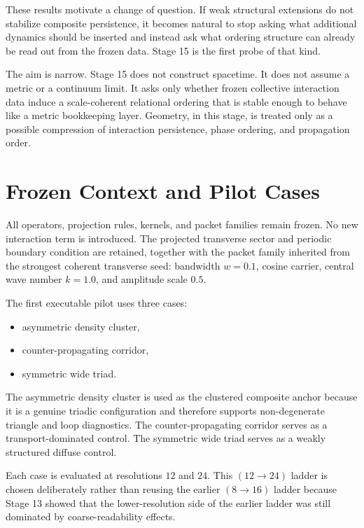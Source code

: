\documentclass[11pt]{article}
\begin{document}
These results motivate a change of question. If weak structural extensions do not stabilize composite persistence, it becomes natural to stop asking what additional dynamics should be inserted and instead ask what ordering structure can already be read out from the frozen data. Stage 15 is the first probe of that kind.

The aim is narrow. Stage 15 does not construct spacetime. It does not assume a metric or a continuum limit. It asks only whether frozen collective interaction data induce a scale-coherent relational ordering that is stable enough to behave like a metric bookkeeping layer. Geometry, in this stage, is treated only as a possible compression of interaction persistence, phase ordering, and propagation order.

\section{Frozen Context and Pilot Cases}

All operators, projection rules, kernels, and packet families remain frozen. No new interaction term is introduced. The projected transverse sector and periodic boundary condition are retained, together with the packet family inherited from the strongest coherent transverse seed: bandwidth \(w=0.1\), cosine carrier, central wave number \(k=1.0\), and amplitude scale \(0.5\).

The first executable pilot uses three cases:
\begin{itemize}
\item asymmetric density cluster,
\item counter-propagating corridor,
\item symmetric wide triad.
\end{itemize}

The asymmetric density cluster is used as the clustered composite anchor because it is a genuine triadic configuration and therefore supports non-degenerate triangle and loop diagnostics. The counter-propagating corridor serves as a transport-dominated control. The symmetric wide triad serves as a weakly structured diffuse control.

Each case is evaluated at resolutions \(12\) and \(24\). This \((12 \rightarrow 24)\) ladder is chosen deliberately rather than reusing the earlier \((8 \rightarrow 16)\) ladder because Stage 13 showed that the lower-resolution side of the earlier ladder was still dominated by coarse-readability effects.
\end{document}
